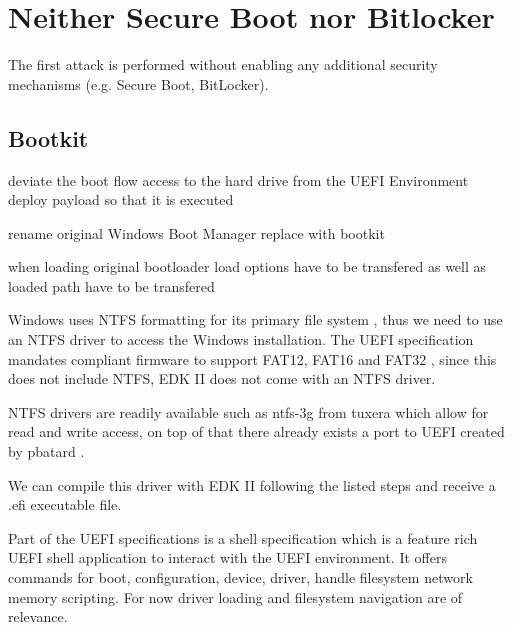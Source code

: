 
\section{Neither Secure Boot nor Bitlocker}

The first attack is performed without enabling any additional security mechanisms (e.g. Secure Boot, BitLocker).

\subsection{Bootkit}

deviate the boot flow
access to the hard drive from the UEFI Environment
deploy payload so that it is executed

rename original Windows Boot Manager
replace with bootkit

when loading original bootloader load options have to be transfered as well as loaded path have to be transfered


Windows uses NTFS formatting for its primary file system \cite{microsoft-ntfs-overview}, thus we need to use an NTFS driver to access the Windows installation.
The UEFI specification mandates compliant firmware to support FAT12, FAT16 and FAT32 \cite[13.3.1.1]{uefi-spec}, since this does not include NTFS, EDK II does not come with an NTFS driver.

NTFS drivers are readily available such as ntfs-3g from tuxera \cite{ntfs-3g} which allow for read and write access, on top of that there already exists a port to UEFI created by pbatard \cite{ntfs-3g-uefi}.

We can compile this driver with EDK II following the listed steps and receive a .efi executable file.

Part of the UEFI specifications is a shell specification which is a feature rich UEFI shell application to interact with the UEFI environment.
It offers commands for
boot,
configuration,
device, driver, handle
filesystem
network
memory
scripting.
For now driver loading and filesystem navigation are of relevance.

